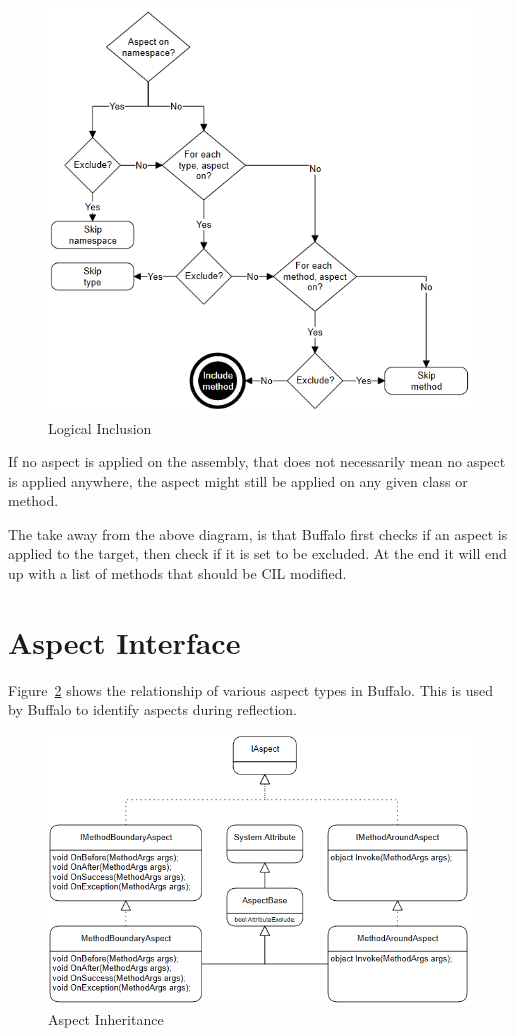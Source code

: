 \begin{figure}[H]
  \includegraphics[scale=1.0]{AspectLogicalInclusion2.PNG}
  \centering
  \caption{Logical Inclusion\label{logical_inclusion}}
\end{figure}

If no aspect is applied on the assembly, that does not necessarily mean no aspect is applied anywhere, the aspect might still be applied on any given class or method.

The take away from the above diagram, is that Buffalo first checks if an aspect is applied to the target, then check if it is set to be excluded. At the end it will end up with a list of methods that should be CIL modified.

\section{Aspect Interface}

Figure~\ref{uml01} shows the relationship of various aspect types in Buffalo. This is used by Buffalo to identify aspects during reflection.

\begin{figure}[H]
  \includegraphics[scale=1.0]{Uml02.PNG}
  \centering
  \caption{Aspect Inheritance\label{uml01}}
\end{figure}

